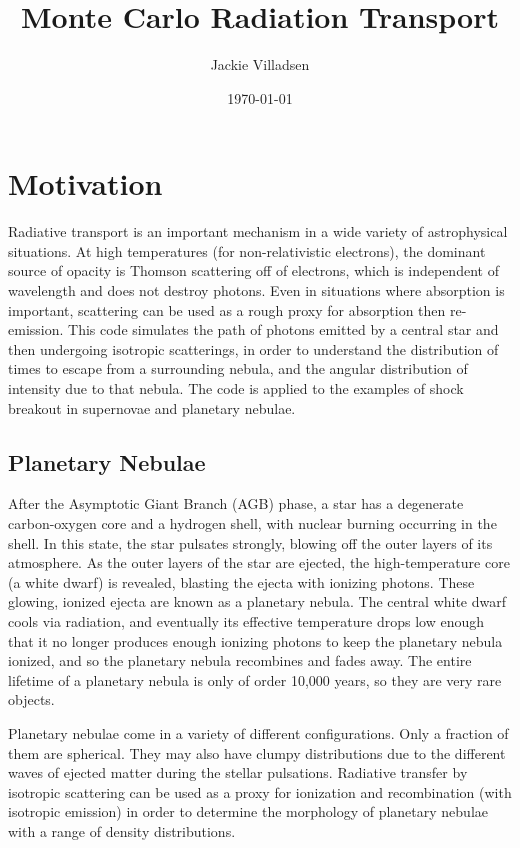 \documentclass{amsart}
\begin{document}
\title{Monte Carlo Radiation Transport}
\author{Jackie Villadsen}
\date{\today}
\maketitle

\section{Motivation}

Radiative transport is an important mechanism in a wide variety of
astrophysical situations.  At high temperatures (for non-relativistic
electrons), the dominant source of opacity is Thomson scattering off of electrons, which is independent of wavelength and does not destroy photons.  
Even in situations where absorption is important, scattering can be used
as a rough proxy for absorption then re-emission.
This code simulates the path of photons emitted by a central star and then undergoing isotropic scatterings, in order to
understand the distribution of times to escape from a surrounding nebula,
and the angular distribution of intensity due to that nebula.
The code is applied to the examples of shock breakout in supernovae and
planetary nebulae.

\subsection{Planetary Nebulae}
After the Asymptotic Giant Branch (AGB) phase, a star has a degenerate carbon-oxygen core and a hydrogen shell, with nuclear burning occurring in the shell.  In this state, the star pulsates strongly, blowing off the outer layers of its atmosphere.  As the outer layers of the star are ejected, the high-temperature core (a white dwarf) is revealed, blasting the ejecta with ionizing photons.  These glowing, ionized ejecta are known as a planetary nebula.  The central white dwarf cools via radiation, and eventually its effective temperature drops low enough that it no longer produces enough ionizing photons to keep the planetary nebula ionized, and so the planetary nebula recombines and fades away.  The entire lifetime of a planetary nebula is only of order 10,000 years, so they are very rare objects.

Planetary nebulae come in a variety of different configurations.  Only a fraction of them are spherical.  They may also have clumpy distributions due to the different waves of ejected matter during the stellar pulsations.  Radiative transfer by isotropic scattering can be used as a proxy for ionization and recombination (with isotropic emission) in order to determine the morphology of planetary nebulae with a range of density distributions.
\end{document}
